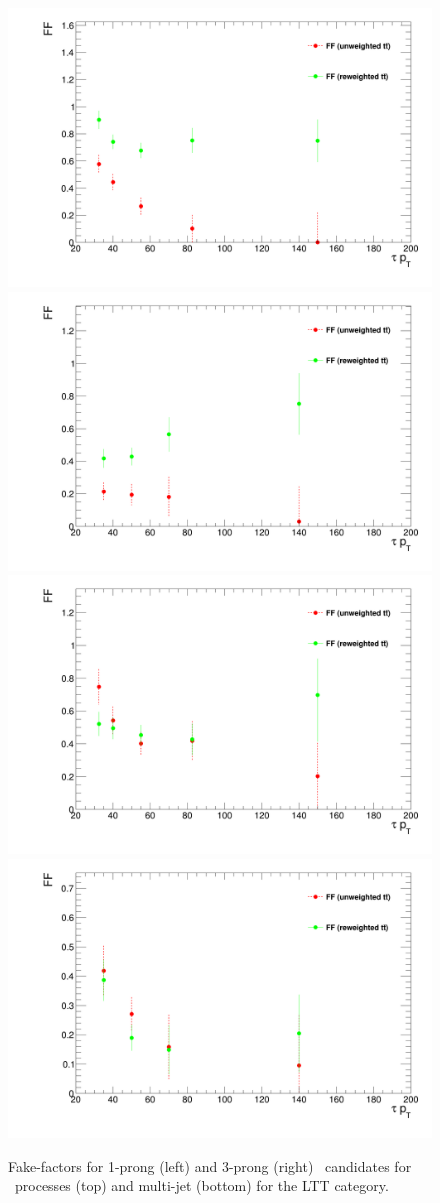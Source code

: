 \begin{figure}
\centering
\includegraphics[width=.4\textwidth]{DiHiggs/plots/FF_CRs/LTTttbarCR1p.png}
\includegraphics[width=.4\textwidth]{DiHiggs/plots/FF_CRs/LTTttbarCR3p.png} \\
\includegraphics[width=.4\textwidth]{DiHiggs/plots/FF_CRs/LTTInvCR1p.png}
\includegraphics[width=.4\textwidth]{DiHiggs/plots/FF_CRs/LTTInvCR3p.png}\\
\caption{Fake-factors for 1-prong (left) and 3-prong (right) \tauhad\ candidates for \ttbar\ processes (top) and multi-jet (bottom) for the \lephad LTT category.}
\label{fig:LTT_FF}
\end{figure}

